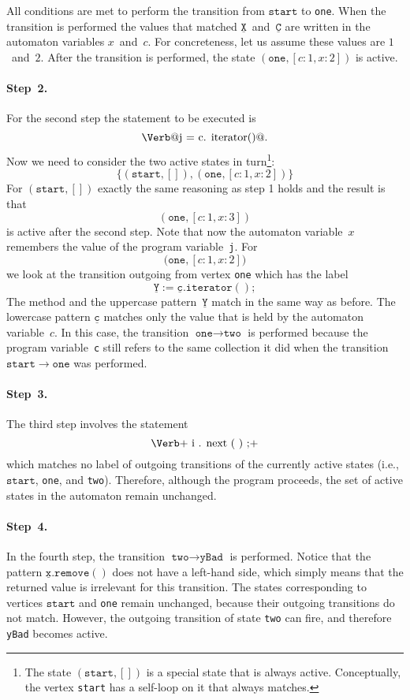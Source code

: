 \documentclass[preprint]{sigplanconf} %
\makeatletter
\newcommand{\pattern}[1]{\ensuremath{\mathtt{\underline{#1}}}}
\newcommand{\start}{\ensuremath{\mathtt{start}}\xspace}
\newcommand{\verbline}[2][]{\[\text{\Verb@#2@}#1\]}
\theoremstyle{definition}
\theoremstyle{remark}
\makeatother
\begin{document}
All conditions are met to perform the transition from \start to \texttt{one}.
When the transition is performed the values that matched \pattern X~and~\pattern C are written in the automaton variables $x$~and~$c$.
For concreteness, let us assume these values are $1$~and~$2$.
After the transition is performed, the state $(\mathtt{one},[c:1,x:2])$ is active.

\paragraph{Step~2.}
For the second step the statement to be executed is \verbline[.]{j = c.\PY{n+na}{iterator}()}
Now we need to consider the two active states in turn\footnote{The state $(\start,[])$ is a special state that is always active.
Conceptually, the vertex \texttt{start} has a self-loop on it that always matches.}:
\[\{(\start,[]), (\texttt{one},[c:1,x:2])\}\] 
For $(\start,[])$ exactly the same reasoning as step 1 holds and the result is that \[(\texttt{one},[c:1,x:3])\] is active after the second step.
Note that now the automaton variable~$x$ remembers the value of the program variable~{\tt j}.
For \[\texttt{(one},[c:1,x:2])\] we look at the transition outgoing from vertex {\tt one} which has the label \[\pattern{Y}:=\pattern{c}.\mathtt{iterator}();\]
The method and the uppercase pattern~$\pattern Y$ match in the same way as before.
The lowercase pattern $\pattern c$ matches only the value that is held by the automaton variable~$c$.
In this case, the transition $\texttt{one}\to\texttt{two}$ is performed because the program variable~{\tt c} still refers to the same collection it did when the transition $\start\to\texttt{one}$ was performed.

\paragraph{Step~3.}

The third step involves the statement
\[\text{\Verb+\PY{n}{i}\PY{o}{.}\PY{n+na}{next}\PY{o}{(}\PY{o}{)}\PY{o}{;}+}\]
which matches no label of outgoing transitions of the currently active states (i.e., $\start$, {\tt one}, and {\tt  two}).
Therefore, although the program proceeds, the set of active states in the automaton remain unchanged.

\paragraph{Step~4.}

In the fourth step, the transition $\texttt{two}\to\texttt{yBad}$ is performed.
Notice that the pattern $\pattern{x}.\mathtt{remove}()$ does not have a left-hand side, which simply means that the returned value is irrelevant for this transition.
The states corresponding to vertices $\start$ and {\tt one} remain unchanged, because their outgoing transitions do not match.
However,  the outgoing transition of state {\tt two} can fire, and therefore {\tt yBad} becomes active.
\end{document}
